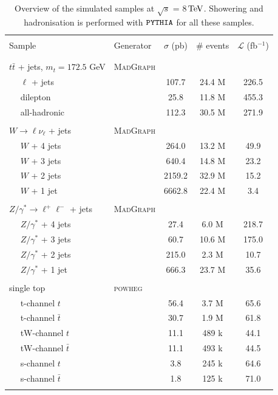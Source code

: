 \begin{table}[htbp]
  \begin{center}
  \caption{Overview of the simulated samples at $\sqrt{s}$ = 8$\, \mathrm{TeV}$. Showering and hadronisation is performed with $\texttt{PYTHIA}$ for all these samples.} \label{table::Samples}
    \begin{tabular}{|l|l|c|c|c|}
      \hline
       & & & & \\
      Sample & Generator & $\sigma$ (pb) & \# events & $\mathcal{L}$ (fb$^{-1}$) \\
       & & & & \\ 
       \hline
       & & & & \\
      $t\bar{t}$ + jets, $m_t = 172.5$ GeV & \textsc{MadGraph} & & & \\
      ~~ $\ell$ + jets & & 107.7 & 24.4 M & 226.5 \\
      ~~ dilepton & & 25.8 & 11.8 M & 455.3 \\
      ~~ all-hadronic & & 112.3 & 30.5 M & 271.9 \\
       & & & & \\
      $W \to \ell \nu_{\ell}$ + jets & \textsc{MadGraph} & & & \\
      ~~ $W$ + 4 jets & & 264.0 & 13.2 M & 49.9 \\
      ~~ $W$ + 3 jets & & 640.4 & 14.8 M & 23.2 \\
      ~~ $W$ + 2 jets & & 2159.2 & 32.9 M & 15.2 \\
      ~~ $W$ + 1 jet & & 6662.8 & 22.4 M & 3.4 \\
       & & & & \\
      $Z/\gamma^* \to \ell^+ \ell^-$ + jets & \textsc{MadGraph} & & & \\
      ~~ $Z/\gamma^*$ + 4 jets & & 27.4 & 6.0 M & 218.7 \\
      ~~ $Z/\gamma^*$ + 3 jets & & 60.7 & 10.6 M & 175.0 \\
      ~~ $Z/\gamma^*$ + 2 jets & & 215.0 & 2.3 M & 10.7 \\
      ~~ $Z/\gamma^*$ + 1 jet & & 666.3 & 23.7 M & 35.6 \\
       & & & & \\
      single top & \textsc{powheg} & & & \\
      ~~ t-channel $t$ & & 56.4 & 3.7 M & 65.6 \\
      ~~ t-channel $\bar{t}$ & & 30.7 & 1.9 M & 61.8 \\
      ~~ tW-channel $t$ & & 11.1 & 489 k & 44.1 \\
      ~~ tW-channel $\bar{t}$ & & 11.1 & 493 k & 44.5 \\
      ~~ s-channel $t$ & & 3.8 & 245 k & 64.6 \\
      ~~ s-channel $\bar{t}$ & & 1.8 & 125 k & 71.0 \\
       & & & & \\
      \hline
   \end{tabular}
 \end{center}
\end{table}

